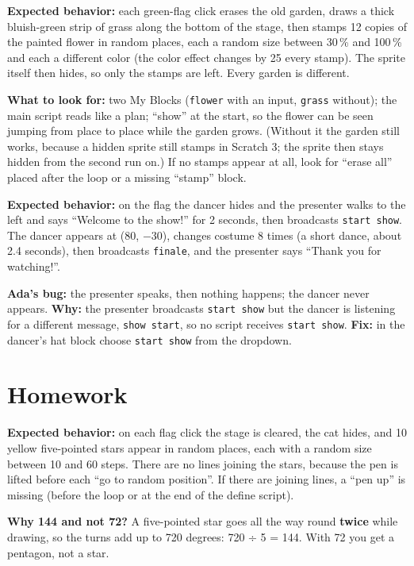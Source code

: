 \begin{answer}
\textbf{Expected behavior:} each green-flag click erases the old garden, draws a thick bluish-green strip of grass along the bottom of the stage, then stamps 12 copies of the painted flower in random places, each a random size between 30\,\% and 100\,\% and each a different color (the color effect changes by 25 every stamp). The sprite itself then hides, so only the stamps are left. Every garden is different.

\textbf{What to look for:} two My Blocks (\texttt{flower} with an input, \texttt{grass} without); the main script reads like a plan; \enquote{show} at the start, so the flower can be seen jumping from place to place while the garden grows. (Without it the garden still works, because a hidden sprite still stamps in Scratch 3; the sprite then stays hidden from the second run on.) If no stamps appear at all, look for \enquote{erase all} placed after the loop or a missing \enquote{stamp} block.
\end{answer}

\begin{answer}
\textbf{Expected behavior:} on the flag the dancer hides and the presenter walks to the left and says \enquote{Welcome to the show!} for 2 seconds, then broadcasts \texttt{start show}. The dancer appears at (80, $-30$), changes costume 8 times (a short dance, about 2.4 seconds), then broadcasts \texttt{finale}, and the presenter says \enquote{Thank you for watching!}.

\textbf{Ada's bug:} the presenter speaks, then nothing happens; the dancer never appears. \textbf{Why:} the presenter broadcasts \texttt{start show} but the dancer is listening for a different message, \texttt{show start}, so no script receives \texttt{start show}. \textbf{Fix:} in the dancer's hat block choose \texttt{start show} from the dropdown.
\end{answer}

\section{Homework}
\begin{answer}
\textbf{Expected behavior:} on each flag click the stage is cleared, the cat hides, and 10 yellow five-pointed stars appear in random places, each with a random size between 10 and 60 steps. There are no lines joining the stars, because the pen is lifted before each \enquote{go to random position}. If there are joining lines, a \enquote{pen up} is missing (before the loop or at the end of the define script).

\textbf{Why 144 and not 72?} A five-pointed star goes all the way round \textbf{twice} while drawing, so the turns add up to 720 degrees: 720 ÷ 5 = 144. With 72 you get a pentagon, not a star.
\end{answer}

